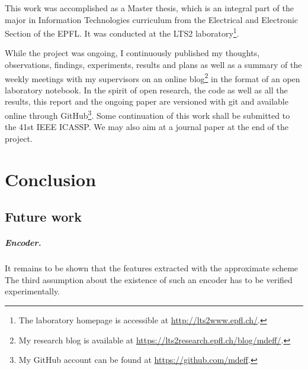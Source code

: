 \documentclass[a4paper,12pt,twoside]{report}
\begin{document}
This work was accomplished as a Master thesis, which is an integral part of the major in Information Technologies curriculum from the Electrical and Electronic Section of the \gls{EPFL}. It was conducted at the LTS2 laboratory\footnote{The laboratory homepage is accessible at \url{http://lts2www.epfl.ch/}.}.

While the project was ongoing, I continuously published my thoughts, observations, findings, experiments, results and plans as well as a summary of the weekly meetings with my supervisors on an online blog\footnote{My research blog is available at \url{https://lts2research.epfl.ch/blog/mdeff/}.} in the format of an open laboratory notebook. In the spirit of open research, the code as well as all the results, this report and the ongoing paper are versioned with git and available online through GitHub\footnote{My GitHub account can be found at \url{https://github.com/mdeff}.}. Some continuation of this work shall be submitted to the 41st IEEE \gls{ICASSP}. We may also aim at a journal paper at the end of the project.










\chapter*{Conclusion}

\section*{Future work}

\paragraph{Encoder.}
It remains to be shown that the features extracted with the approximate scheme
The third assumption about the existence of such an encoder has to be verified experimentally. %
\end{document}
